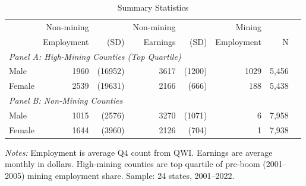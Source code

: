 \begin{table}[htbp]
\centering
\caption{Summary Statistics}
\label{tab:sumstats}
\begin{threeparttable}
\begin{tabular}{lrrrrrrr}
\toprule
 & Non-mining & & Non-mining & & Mining & \\
 & Employment & (SD) & Earnings & (SD) & Employment & N \\
\midrule
\multicolumn{7}{l}{\textit{Panel A: High-Mining Counties (Top Quartile)}} \\
Male & 1960 & (16952) & 3617 & (1200) & 1029 & 5,456 \\
Female & 2539 & (19631) & 2166 & (666) & 188 & 5,438 \\
\midrule
\multicolumn{7}{l}{\textit{Panel B: Non-Mining Counties}} \\
Male & 1015 & (2576) & 3270 & (1071) & 6 & 7,958 \\
Female & 1644 & (3960) & 2126 & (704) & 1 & 7,938 \\
\bottomrule
\end{tabular}
\begin{tablenotes}[flushleft]
\small
\item \textit{Notes:} Employment is average Q4 count from QWI. Earnings are average monthly in dollars. High-mining counties are top quartile of pre-boom (2001--2005) mining employment share. Sample: 24 states, 2001--2022.
\end{tablenotes}
\end{threeparttable}
\end{table}
